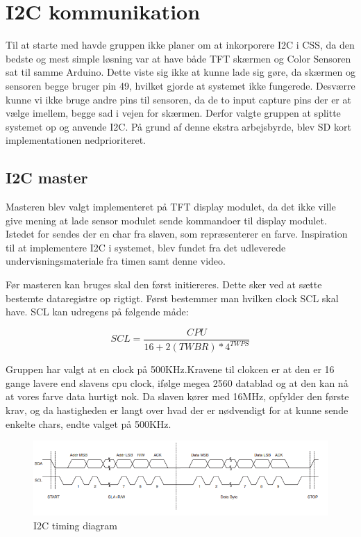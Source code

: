 \graphicspath{{Chapters/Test/}}


\section{I2C kommunikation}
Til at starte med havde gruppen ikke planer om at inkorporere I2C i CSS, da den bedste og mest simple løsning var at have både TFT skærmen og Color Sensoren sat til samme Arduino. Dette viste sig ikke at kunne lade sig gøre, da skærmen og sensoren begge bruger pin 49, hvilket gjorde at systemet ikke fungerede. Desværre kunne vi ikke bruge andre pins til sensoren, da de to input capture pins der er at vælge imellem, begge sad i vejen for skærmen. Derfor valgte gruppen at splitte systemet op og anvende I2C. På grund af denne ekstra arbejsbyrde, blev SD kort implementationen nedprioriteret.

\subsection{I2C master}
Masteren blev valgt implementeret på TFT display modulet, da det ikke ville give mening at lade sensor modulet sende kommandoer til display modulet. Istedet for sendes der en char fra slaven, som repræsenterer en farve. Inspiration til at implementere I2C i systemet, blev fundet fra det udleverede undervisningsmateriale fra timen samt denne video\cite{mic:I2CVideo}.

Før masteren kan bruges skal den først initiereres. Dette sker ved at sætte bestemte dataregistre op rigtigt. Først bestemmer man hvilken clock SCL skal have. SCL kan udregens på følgende måde:

\begin{equation}
SCL= \frac{CPU}{16+2(TWBR)*4^{TWPS}} 
\end{equation}

Gruppen har valgt at en clock på 500KHz.Kravene til clokcen er at den er 16 gange lavere end slavens cpu clock, ifølge megea 2560 datablad og at den kan nå at vores farve data hurtigt nok. Da slaven kører med 16MHz, opfylder den første krav, og da hastigheden er langt over hvad der er nødvendigt for at kunne sende enkelte chars, endte valget på 500KHz. 

\begin{figure}[H]
	\centering
	\includegraphics[width = 450pt]{Img/I2CTiming.png}
	\caption{I2C timing diagram}
	\label{fig:I2CTIming}
\end{figure}


